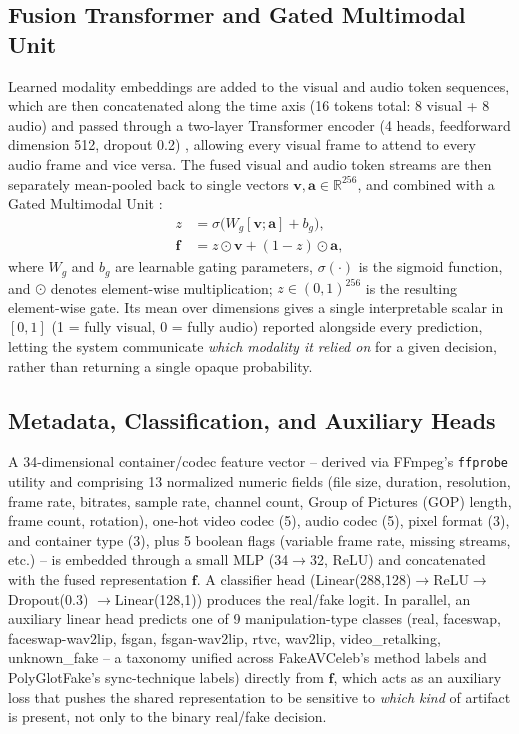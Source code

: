 \documentclass[conference]{IEEEtran}
\begin{document}
\subsection{Fusion Transformer and Gated Multimodal Unit}
Learned modality embeddings are added to the visual and audio token
sequences, which are then concatenated along the time axis (16 tokens
total: 8 visual + 8 audio) and passed through a two-layer Transformer
encoder (4 heads, feedforward dimension 512, dropout 0.2)
\cite{vaswani2017attention}, allowing every visual frame to attend to every
audio frame and vice versa. The fused visual and audio token streams are
then separately mean-pooled back to single vectors $\mathbf{v},\mathbf{a}
\in \mathbb{R}^{256}$, and combined with a Gated Multimodal Unit
\cite{arevalo2017gmu}:
\begin{align}
z &= \sigma\big(W_g[\mathbf{v};\mathbf{a}] + b_g\big), \\
\mathbf{f} &= z \odot \mathbf{v} + (1-z) \odot \mathbf{a},
\end{align}
where $W_g$ and $b_g$ are learnable gating parameters, $\sigma(\cdot)$ is
the sigmoid function, and $\odot$ denotes element-wise multiplication; $z
\in (0,1)^{256}$ is the resulting element-wise gate. Its mean over dimensions
gives a single interpretable scalar in $[0,1]$ (1 = fully visual, 0 = fully
audio) reported alongside every prediction, letting the system communicate
\emph{which modality it relied on} for a given decision, rather than
returning a single opaque probability.

\subsection{Metadata, Classification, and Auxiliary Heads}
A 34-dimensional container/codec feature vector -- derived via FFmpeg's
\texttt{ffprobe} utility and comprising 13 normalized numeric fields (file
size, duration, resolution, frame rate, bitrates, sample rate, channel
count, Group of Pictures (GOP) length, frame count, rotation), one-hot
video codec (5), audio codec (5),
pixel format (3), and container type (3), plus 5 boolean flags (variable
frame rate, missing streams, etc.) -- is embedded through a small MLP
(34$\to$32, ReLU) and concatenated with the fused representation
$\mathbf{f}$. A classifier head (Linear(288,128)$\to$ReLU$\to$Dropout(0.3)
$\to$Linear(128,1)) produces the real/fake logit. In parallel, an
auxiliary linear head predicts one of 9 manipulation-type classes (real,
faceswap, faceswap-wav2lip, fsgan, fsgan-wav2lip, rtvc, wav2lip,
video\_retalking, unknown\_fake -- a taxonomy unified across FakeAVCeleb's
method labels and PolyGlotFake's sync-technique labels) directly from
$\mathbf{f}$, which acts as an auxiliary loss that pushes the shared
representation to be sensitive to \emph{which kind} of artifact is present,
not only to the binary real/fake decision.
\end{document}
